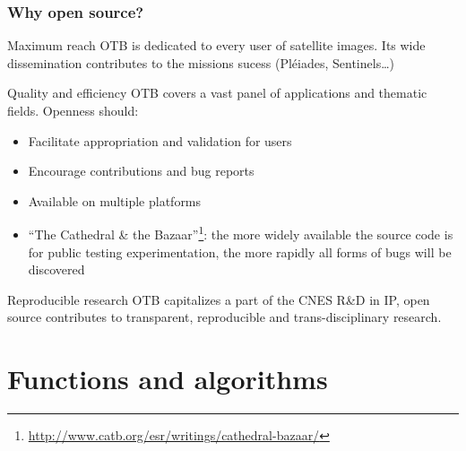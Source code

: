 \documentclass[8pt]{beamer}
\begin{document}
\begin{frame}
\frametitle{Why open source?}

\begin{block}{Maximum reach}
OTB is dedicated to every user of satellite images. Its wide
dissemination contributes to the missions sucess (Pléiades, Sentinels\ldots)
\end{block}

\begin{block}{Quality and efficiency}
OTB covers a vast panel of applications and thematic fields. Openness should:
\begin{itemize}
\item Facilitate appropriation and validation for users
\item Encourage contributions and bug reports
\item Available on multiple platforms
\item ``The Cathedral \& the
  Bazaar''\footnote{\url{http://www.catb.org/esr/writings/cathedral-bazaar/}}: the more widely available the source code is for public testing
  experimentation, the more rapidly all forms of bugs will be discovered
\end{itemize}
\end{block}

\begin{block}{Reproducible research}
OTB capitalizes a part of the CNES R\&D in IP, open source contributes to  transparent, \alert{reproducible} and trans-disciplinary \alert{research}.
\end{block}

\end{frame}

\section{Functions and algorithms}
\end{document}
